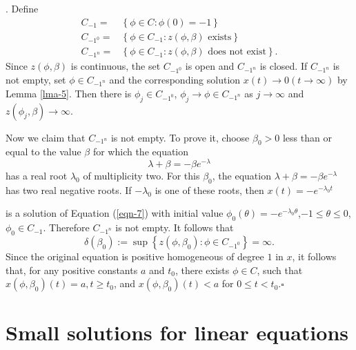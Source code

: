\begin{frame}[t]
.  Define 
\begin{align*}
  C_{-1}=&\left\{\phi \in C:\phi(0)=-1\right\} \\
  C_{-1^{0}}=& \left\{\phi \in C_{-1}:z(\phi,\beta) \text{ exists}\right\} \\
  C_{-1^{n}}=& \left\{\phi \in C_{-1}:z(\phi,\beta) \text{ does not exist}\right\} 
.\end{align*}
Since $z(\phi,\beta)$ is continuous, the set $C_{-1^{0}}$ is open and  $C_{-1^{n}}$ is closed. If $C_{-1^{n}}$ is not empty, set $\phi \in C_{-1^{n}}$ and the corresponding solution  $x(t)\to 0\left( t\to \infty \right) $ by Lemma \ref{lma-5}. Then there is $\phi_j \in C_{-1^{0}}$, $\phi_j \to \phi \in C_{-1^{n}}$ as $j\to \infty$ and $z(\phi_j,\beta)\to \infty$.

Now we claim that $C_{-1^{n}}$ is not empty. To prove it, choose $\beta_0>0$ less than or equal to the value $\beta$ for which the equation
\[
\lambda+\beta=-\beta e^{-\lambda}
\] 
has a real root $\lambda_0$ of multiplicity two. For this $\beta_0$, the equation $\lambda+\beta=-\beta e^{-\lambda}$ has two real negative roots. If $-\lambda_0$ is one of these roots, then $x(t)=-e^{-\lambda_0 t}$ 
\end{frame}

\begin{frame}[t]
is a solution of Equation (\ref{eqn-7}) with initial value $\phi_0(\theta)=-e^{-\lambda_0\theta}$,$-1\le \theta\le 0$, $\phi_0 \in C_{-1}$. Therefore $C_{-1^{n}}$ is not empty. It follows that 
\[
  \delta(\beta_0):=\sup \left\{z(\phi,\beta_0):\phi \in C_{-1^{0}}\right\} =\infty.
\] 
Since the original equation is positive homogeneous of degree $1$ in $x$, it follows that, for any positive constants $a$ and $t_0$, there exists $\phi \in C$, such that $x(\phi,\beta_0)(t)=a,t\ge t_0$, and $x(\phi,\beta_0)(t)<a$ for $0\le t<t_0$.\hfill $\square$\par 
\end{frame}

\section{Small solutions for linear equations}


